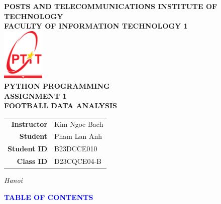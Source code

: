 \documentclass[a4paper,12pt]{article}
\begin{document}
\fontsize{14pt}{16pt}\selectfont
\begin{titlepage}
\begin{center}
 

\vspace*{0.5cm}
\textbf{POSTS AND TELECOMMUNICATIONS INSTITUTE OF TECHNOLOGY}\\[0.2cm]
\textbf{FACULTY OF INFORMATION TECHNOLOGY 1}\\[1.5cm]
\includegraphics[width=0.15\textwidth]{ptit-logo.png}\\[3cm]

\textbf{\Large PYTHON PROGRAMMING}\\[0.5cm]
\textbf{ASSIGNMENT 1}\\[0.5cm]
\textbf{\LARGE FOOTBALL DATA ANALYSIS}\\[3cm]

{\Large
\begin{center}
\begin{tabular}{r@{: }l}
\textbf{Instructor} & Kim Ngoc Bach \\
\textbf{Student} & Pham Lan Anh \\
\textbf{Student ID} & B23DCCE010 \\
\textbf{Class ID} & D23CQCE04-B \\
\end{tabular}
\end{center}
}

\vfill
\textit{Hanoi}

\end{center}
\end{titlepage}

\newpage
\begin{center}
    \textcolor{blue}{\textbf{\Large TABLE OF CONTENTS}}
\end{center}
\end{document}
